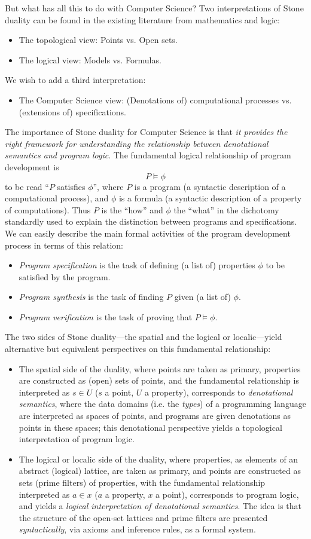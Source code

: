 But what has all this to do with Computer Science?
Two interpretations of Stone duality can be found in the existing literature from mathematics and logic:
\begin{itemize}
\item The topological view: Points vs. Open sets.
\item The logical view: Models vs. Formulas.
\end{itemize}
We wish to add a third interpretation:
\begin{itemize}
\item The Computer Science view: (Denotations of) computational processes vs. (extensions of) specifications.
\end{itemize}
The importance of Stone duality for Computer Science is that {\em it provides the right framework for understanding the relationship between denotational semantics and program logic}.
The fundamental logical relationship of program development is
\[ P \models \phi \]
to be read ``$P$ satisfies $\phi$'', where $P$ is a program (a syntactic description of a computational process), and $\phi$ is a formula (a syntactic description of a property of computations).
Thus $P$ is the ``how'' and $\phi$ the ``what'' in the dichotomy standardly used to explain the distinction between programs and specifications.
We can easily describe the main formal activities of the program development process in terms of this relation:
\begin{itemize}
\item {\em Program specification} is the task of defining (a list of) properties $\phi$ to be satisfied by the program.
\item {\em Program synthesis} is the task of finding $P$ given (a list of) $\phi$.
\item {\em Program verification} is the task of proving that $P \models \phi$.
\end{itemize}
The two sides of Stone duality---the spatial and the logical or localic---yield alternative but equivalent perspectives on this fundamental relationship:
\begin{itemize}
\item The spatial side of the duality, where points are taken as primary, 
properties are constructed as (open) sets of points, and the fundamental 
relationship is interpreted as $s \in U$ ($s$ a point, $U$ a property), 
corresponds to {\em denotational semantics}, where the data domains 
(i.e. the {\em types}) of a programming language are interpreted as spaces 
of points, and programs are given denotations as points in these spaces; 
this denotational perspective yields a topological interpretation of program logic.
\item The logical or localic side of the duality, where properties,  
as elements of an abstract (logical) lattice, are taken as primary, 
and points are constructed as sets (prime filters) of properties, 
with the fundamental relationship interpreted as $a \in x$ ($a$ a property, 
$x$ a point), corresponds to program logic, and yields a {\em logical interpretation of denotational semantics}.
The idea is that the structure of the open-set lattices and prime filters are presented {\em syntactically}, via axioms and inference rules, as a formal system.
\end{itemize}
